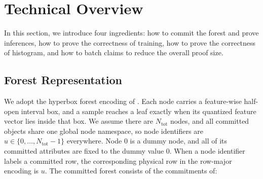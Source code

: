 \section{Technical Overview}\label{sec:technical-overview}

In this section, we introduce four ingredients: 
how to commit the forest and prove inferences,
how to prove the correctness of training,
how to prove the correctness of histogram,
and how to batch claims to reduce the overall proof size.

\subsection{Forest Representation}

We adopt the hyperbox forest encoding of \cite{cq++24}. Each node carries a
feature-wise half-open interval box, and a sample reaches a leaf exactly when
its quantized feature vector lies inside that box. 
We assume there are $N_{\mathrm{tot}}$ nodes, and
all committed objects share
one global node namespace, so node identifiers are
$u \in \{0,\ldots,N_{\mathrm{tot}}-1\}$ everywhere. Node $0$ is a dummy node, and
all of its committed attributes are fixed to the dummy value $0$. When a node identifier labels
a committed row, the corresponding physical row in the row-major encoding is
$u$. The committed
forest consists of the commitments of:
